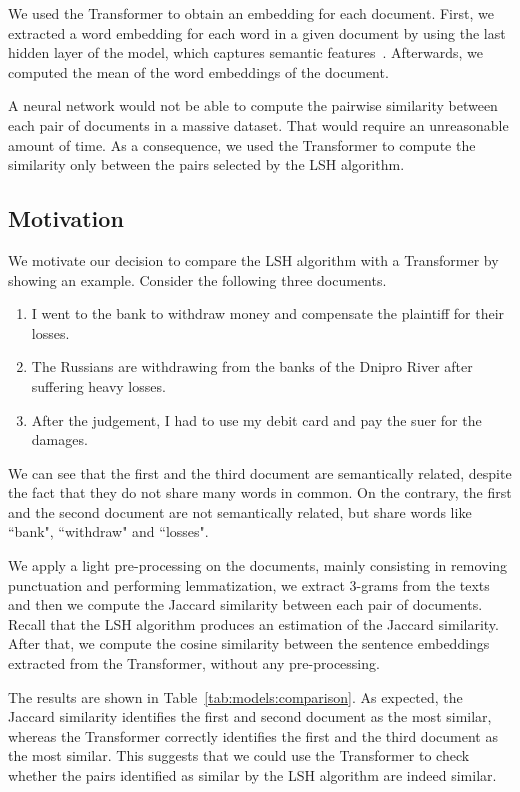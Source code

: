 \documentclass[runningheads]{llncs}
\begin{document}
We used the Transformer to obtain an embedding for each document. First, we extracted a word embedding for each word in a given document by using the last hidden layer of the model, which captures semantic features~\cite{laicher-etal-2021-explaining}. Afterwards, we computed the mean of the word embeddings of the document.

A neural network would not be able to compute the pairwise similarity between each pair of documents in a massive dataset. That would require an unreasonable amount of time. As a consequence, we used the Transformer to compute the similarity only between the pairs selected by the LSH algorithm.

\subsection{Motivation}
\label{subsec:models:motivation}

We motivate our decision to compare the LSH algorithm with a Transformer by showing an example. Consider the following three documents.
\begin{enumerate}
  \item I went to the bank to withdraw money and compensate the plaintiff for their losses.
  \item The Russians are withdrawing from the banks of the Dnipro River after suffering heavy losses.
  \item After the judgement, I had to use my debit card and pay the suer for the damages.
\end{enumerate}
We can see that the first and the third document are semantically related, despite the fact that they do not share many words in common. On the contrary, the first and the second document are not semantically related, but share words like “bank", “withdraw" and “losses".

We apply a light pre-processing on the documents, mainly consisting in removing punctuation and performing lemmatization, we extract 3-grams from the texts and then we compute the Jaccard similarity between each pair of documents. Recall that the LSH algorithm produces an estimation of the Jaccard similarity. After that, we compute the cosine similarity between the sentence embeddings extracted from the Transformer, without any pre-processing.

The results are shown in Table~\ref{tab:models:comparison}. As expected, the Jaccard similarity identifies the first and second document as the most similar, whereas the Transformer correctly identifies the first and the third document as the most similar. This suggests that we could use the Transformer to check whether the pairs identified as similar by the LSH algorithm are indeed similar.
\end{document}
